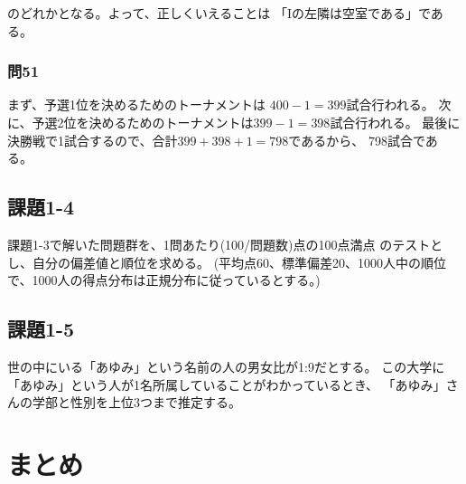 \documentclass[12pt]{jarticle}
\begin{document}
のどれかとなる。よって、正しくいえることは
「Iの左隣は空室である」である。

\subsubsection{問51}
まず、予選1位を決めるためのトーナメントは
$400-1=399$試合行われる。
次に、予選2位を決めるためのトーナメントは$399-1=398$試合行われる。
最後に決勝戦で1試合するので、合計$399+398+1=798$であるから、
798試合である。

\subsection{課題1-4}
\begin{shadebox}
    課題1-3で解いた問題群を、1問あたり(100/問題数)点の100点満点
    のテストとし、自分の偏差値と順位を求める。
    (平均点60、標準偏差20、1000人中の順位で、1000人の得点分布は正規分布に従っているとする。)
\end{shadebox}

\subsection{課題1-5}
\begin{shadebox}
    世の中にいる「あゆみ」という名前の人の男女比が1:9だとする。
    この大学に「あゆみ」という人が1名所属していることがわかっているとき、
    「あゆみ」さんの学部と性別を上位3つまで推定する。
\end{shadebox}

\section{まとめ}


\clearpage

\begin{thebibliography}{99}
    \label{sannkoubunnkenn_chapter}

\end{thebibliography}


\clearpage

\appendix

\end{document}
